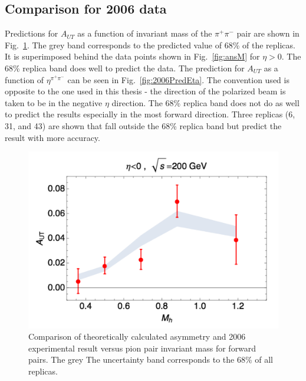 \documentclass[letterpaper, abstract = on,listof=totoc, bibliography=totoc]{scrreprt}
\newcommand{\etapair}{\eta^{\pi^+\pi^-}}
\newcommand{\pip}{\pi^+}
\newcommand{\pim}{\pi^-}
\newcommand{\pair}{$\pip\pim$ }
\begin{document}
\subsection{Comparison for 2006 data}

Predictions for $A_{UT}$ as a function of invariant mass of the \pair pair are shown in Fig.~\ref{fig:2006PredM}. The grey band corresponds to the predicted value of 68\% of the replicas. It is superimposed behind the data points shown in Fig.~\ref{fig:ansM} for $\eta > 0$. The 68\% replica band does well to predict the data. The prediction for $A_{UT}$ as a function of $\etapair$ can be seen in Fig.~\ref{fig:2006PredEta}. The convention used is opposite to the one used in this thesis - the direction of the polarized beam is taken to be in the negative $\eta$ direction. The 68\% replica band does not do as well to predict the results especially in the most forward direction. Three replicas (6, 31, and 43) are shown that fall outside the 68\% replica band but predict the result with more accuracy.  

\begin{figure}
\begin{center}
\includegraphics[width = .6\textwidth]{2006PredM}
\caption[Comparison of theoretically calculated asymmetry and 2006 experimental result versus pion pair invariant mass]{Comparison of theoretically calculated asymmetry and 2006 experimental result versus pion pair invariant mass for forward pairs. The grey The uncertainty band corresponds to the 68\% of all replicas.}
\label{fig:2006PredM}
\end{center}
\end{figure}
\end{document}
